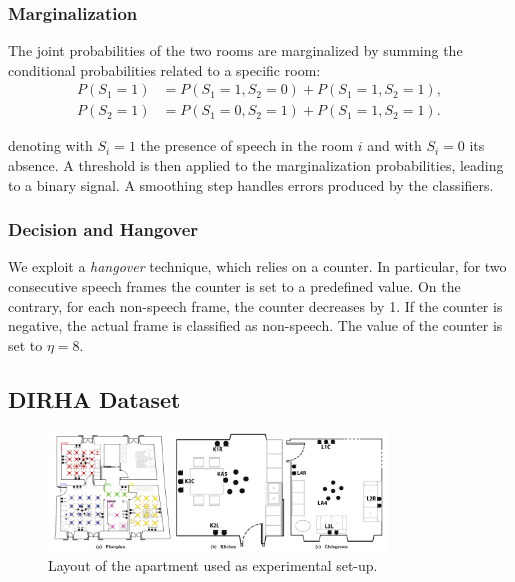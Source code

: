 \subsubsection{Marginalization}
The joint probabilities of the two rooms are marginalized by summing the conditional probabilities related to a specific room:
\begin{align}
P(S_1=1) &= P(S_1=1, S_2=0) + P(S_1=1, S_2=1), \\
P(S_2=1) &= P(S_1=0, S_2=1) + P(S_1=1, S_2=1).
\end{align}

denoting with $S_i=1$ the presence of speech in the room $i$ and with $S_i=0$ its absence.
A threshold is then applied to the marginalization probabilities, leading to a binary signal. A smoothing step handles errors produced by the classifiers.

\subsubsection{Decision and Hangover}

We exploit a \emph{hangover} technique, which relies on a counter. In particular, for two consecutive speech frames  the counter is set to a predefined value. On the contrary, for each non-speech frame, the counter decreases by 1. If the counter is negative, the actual frame is classified as non-speech. The value of the counter is set to $\eta=8$.

\subsection{DIRHA Dataset}

\begin{figure}[h]
 \centering
 \includegraphics[width=0.8\textwidth]{img/plan}
 \caption[DIRHA Apartment]{Layout of the apartment used as experimental set-up.}
 \label{fig:plan}
\end{figure}

